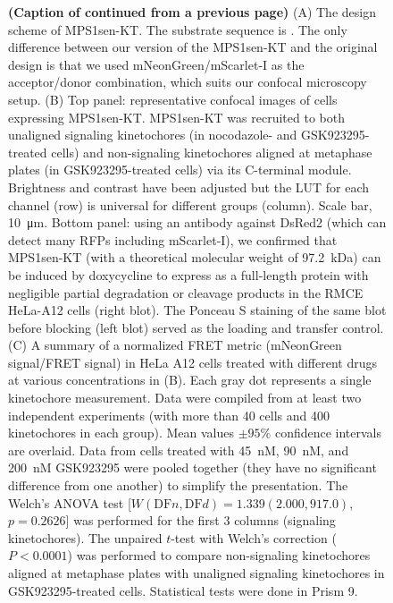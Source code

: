 \begin{figure}
    \noindent\justifying \textbf{(Caption of  continued from a previous page)} (A) The design scheme of MPS1sen-KT. The  substrate sequence is .
    The only difference between our version of the MPS1sen-KT and the original design \cite{MPS1senor} is that we used mNeonGreen/mScarlet-I as the acceptor/donor combination, which suits our confocal microscopy setup. (B) Top panel: representative confocal images of cells expressing MPS1sen-KT. MPS1sen-KT was recruited to both unaligned signaling kinetochores (in nocodazole- and GSK923295-treated cells) and non-signaling kinetochores aligned at metaphase plates (in GSK923295-treated cells) via its C-terminal  module. Brightness and contrast have been adjusted but the LUT for each channel (row) is universal for different groups (column). Scale bar, \SI{10}{\micro m}. Bottom panel: using an antibody against DsRed2 (which can detect many RFPs including mScarlet-I), we confirmed that MPS1sen-KT (with a theoretical molecular weight of \SI{97.2}{kDa}) can be induced by doxycycline to express as a full-length protein with negligible partial degradation or cleavage products in the RMCE HeLa-A12 cells (right blot). The Ponceau S staining of the same blot before blocking (left blot) served as the loading and transfer control. (C) A summary of a normalized FRET metric (mNeonGreen signal/FRET signal) in HeLa A12 cells treated with different drugs at various concentrations in (B). Each gray dot represents a single kinetochore measurement. Data were compiled from at least two independent experiments (with more than 40 cells and 400 kinetochores in each group). Mean values $\pm 95\%$ confidence intervals are overlaid. Data from cells treated with \SI{45}{nM}, \SI{90}{nM}, and \SI{200}{nM} GSK923295 were pooled together (they have no significant difference from one another) to simplify the presentation. The Welch's ANOVA test [$W(\text{DF}n, \text{DF}d) = 1.339 (2.000, 917.0)$, $p = 0.2626$] was performed for the first 3 columns (signaling kinetochores). The unpaired $t$-test with Welch's correction ($P < 0.0001$) was performed to compare non-signaling kinetochores aligned at metaphase plates with unaligned signaling kinetochores in GSK923295-treated cells. Statistical tests were done in Prism 9.
\end{figure}

